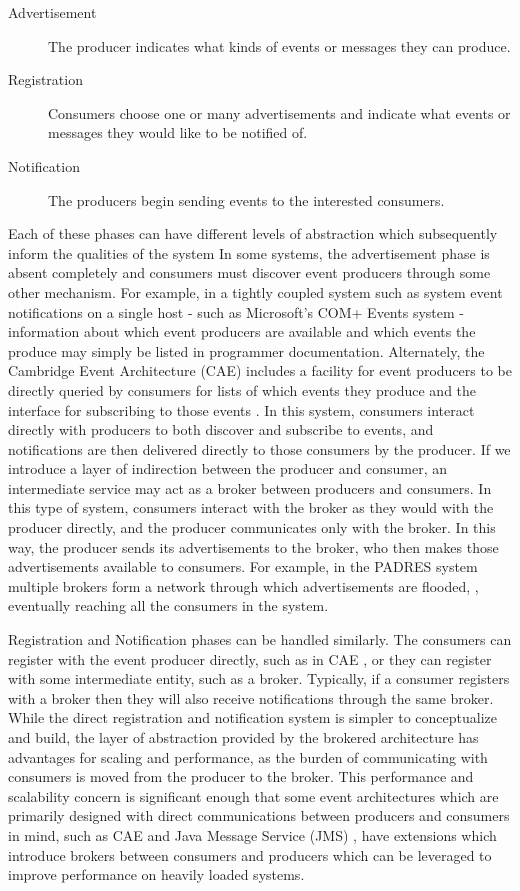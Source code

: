 \documentclass{acm_proc_article-sp}
\begin{document}
\begin{description}
\item[Advertisement] The producer indicates what kinds of events or messages they can produce.
\item[Registration] Consumers choose one or many advertisements and indicate what events or messages they would like to be notified of.
\item[Notification] The producers begin sending events to the interested consumers.
\end{description}

Each of these phases can have different levels of abstraction which subsequently inform the qualities of the system In some systems, the advertisement phase is absent completely and consumers must discover event producers through some other mechanism. For example, in a tightly coupled system such as system event notifications on a single host - such as Microsoft's COM+ Events system - information about which event producers are available and which events the produce may simply be listed in programmer documentation. Alternately, the Cambridge Event Architecture (CAE) includes a facility for event producers to be directly queried by consumers for lists of which events they produce and the interface for subscribing to those events \cite{Bacon:2000p6818}. In this system, consumers interact directly with producers to both discover and subscribe to events, and notifications are then delivered directly to those consumers by the producer. If we introduce a layer of indirection between the producer and consumer, an intermediate service may act as a broker between producers and consumers. In this type of system, consumers interact with the broker as they would with the producer directly, and the producer communicates only with the broker. In this way, the producer sends its advertisements to the broker, who then makes those advertisements available to consumers. For example, in the PADRES system multiple brokers form a network through which advertisements are flooded, \cite{Jacobsen:2010p8313}, eventually reaching all the consumers in the system.

Registration and Notification phases can be handled similarly. The consumers can register with the event producer directly, such as in CAE \cite{Bacon:2000p6818}, or they can register with some intermediate entity, such as a broker. Typically, if a consumer registers with a broker then they will also receive notifications through the same broker. While the direct registration and notification system is simpler to conceptualize and build, the layer of abstraction provided by the brokered architecture has advantages for scaling and performance, as the burden of communicating with consumers is moved from the producer to the broker. This performance and scalability concern is significant enough that some event architectures which are primarily designed with direct communications between producers and consumers in mind, such as CAE \cite{Bacon:2000p6818} and Java Message Service (JMS) \cite{Oracle:2002p8432}, have extensions which introduce brokers between consumers and producers which can be leveraged to improve performance on heavily loaded systems.
\end{document}
